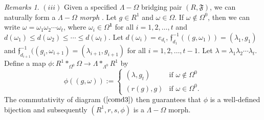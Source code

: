 \documentclass[12pt]{amsart}
\theoremstyle{definition}
\theoremstyle{remark}
\newtheorem{rmks}[thm]{Remarks}
\begin{document}
\begin{rmks}
$(iii)$ Given a specified $\Lambda-\Omega$ bridging pair $(R,\mathfrak{F})$, we can naturally form a $\Lambda-\Omega$ \emph{morph} \cite[Definition 3.1]{KPS}. Let $g\in R^1$ and $\omega\in \Omega$. If $\omega\notin \Omega^0$, then we can write $\omega=\omega_1\omega_2\cdots\omega_t$, where $\omega_i\in \Omega^\mathbf{1}$ for all $i=1,2,\ldots,t$ and $d(\omega_1)\le d(\omega_2)\le \cdots \le d(\omega_t)$. Let $d(\omega_i)=e_{d_i}$, $\mathfrak{f}_{d_1}^{-1}((g,\omega_1))=(\lambda_1,g_1)$ and $\mathfrak{f}_{d_{i+1}}^{-1}((g_i,\omega_{i+1})=(\lambda_{i+1},g_{i+1})$ for all $i=1,2,\ldots,t-1$. Let $\lambda=\lambda_1\lambda_2\cdots \lambda_t$. Define a map $\phi:R^1*_{\Omega^0}\Omega\longrightarrow \Lambda*_{\Lambda^0}R^1$ by 
$$\phi((g,\omega)) :=
	\left\{
	\begin{array}{ll}
		 (\lambda,g_t) & \mbox{if } \omega\notin \Omega^0\\
            (r(g),g)  & \mbox{if } \omega\in \Omega^0.
	\end{array}
	\right.$$ 
The commutativity of diagram $(\ref{comd3})$ then guarantees that $\phi$ is a well-defined bijection and subsequently $(R^1,r,s,\phi)$ is a $\Lambda-\Omega$ morph. 
\end{rmks}
\end{document}
